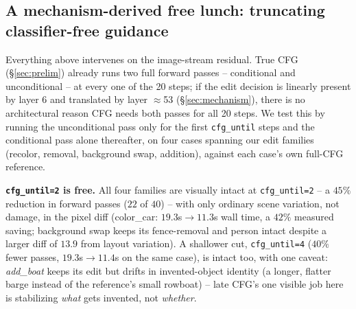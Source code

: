 \documentclass[10pt,twocolumn]{article}
\begin{document}
\subsection{A mechanism-derived free lunch: truncating classifier-free
guidance}\label{sec:cfgfreelunch}

Everything above intervenes on the image-stream residual. True CFG
(\S\ref{sec:prelim}) already runs two full forward passes -- conditional
and unconditional -- at every one of the 20 steps; if the edit decision
is linearly present by layer 6 and translated by layer $\approx$53
(\S\ref{sec:mechanism}), there is no architectural reason CFG needs both
passes for all 20 steps. We test this by running the unconditional pass
only for the first \texttt{cfg\_until} steps and the conditional pass
alone thereafter, on four cases spanning our edit families (recolor,
removal, background swap, addition), against each case's own full-CFG
reference.

\textbf{\texttt{cfg\_until=2} is free.} All four families are visually
intact at \texttt{cfg\_until=2} -- a $45\%$ reduction in forward passes
($22$ of $40$) -- with only ordinary scene variation, not damage, in the
pixel diff (color\_car: $19.3$s$\to$$11.3$s wall time, a $42\%$ measured
saving; background swap keeps its fence-removal and person intact
despite a larger diff of $13.9$ from layout variation). A shallower cut,
\texttt{cfg\_until=4} ($40\%$ fewer passes, $19.3$s$\to$$11.4$s on the
same case), is intact too, with one caveat: \emph{add\_boat} keeps its
edit but drifts in invented-object identity (a longer, flatter barge
instead of the reference's small rowboat) -- late CFG's one visible job
here is stabilizing \emph{what} gets invented, not \emph{whether}.
\end{document}
